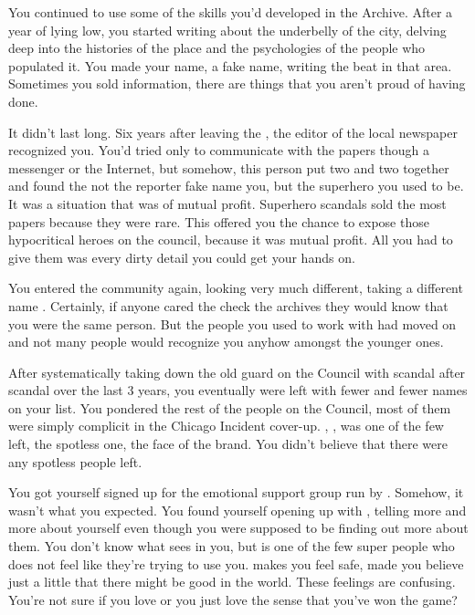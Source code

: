 \documentclass[char]{LRSguildcamp1}
\begin{document}
You continued to use some of the skills you'd developed in the Archive. After a year of lying low, you started writing about the underbelly of the city, delving deep into the histories of the place and the psychologies of the people who populated it. You made your name, a fake name, writing the beat in that area. Sometimes you sold information, there are things that you aren't proud of having done. 

It didn't last long. Six years after leaving the \cHeroLeague{}, the editor of the local newspaper recognized you. You'd tried only to communicate with the papers though a messenger or the Internet, but somehow, this person put two and two together and found the not the reporter fake name you, but the superhero you used to be. It was a situation that was of mutual profit. Superhero scandals sold the most papers because they were rare. This offered you the chance to expose those hypocritical heroes on the council, because it was mutual profit. All you had to give them was every dirty detail you could get your hands on. 

You entered the community again, looking very much different, taking a different name \cYS{\MYsupername}. Certainly, if anyone cared the check the archives they would know that you were the same person. But the people you used to work with had moved on and not many people would recognize you anyhow amongst the younger ones.  

After systematically taking down the old guard on the Council with scandal after scandal over the last 3 years, you eventually were left with fewer and fewer names on your list. You pondered the rest of the people on the Council, most of them were simply complicit in the Chicago Incident cover-up. \cYoungest{\MYsupername}, \cYoungest{}, was one of the few left, the spotless one, the face of the brand. You didn't believe that there were any spotless people left. 
 
You got yourself signed up for the emotional support group run by \cYoungest{\them}. Somehow, it wasn't what you expected. You found yourself opening up with \cYoungest{\them}, telling \cYoungest{\them} more and more about yourself even though you were supposed to be finding out more about them. You don't know what \cYoungest{\they} sees in you, but \cYoungest{\they} is one of the few super people who does not feel like they're trying to use you. \cYoungest{\intro} makes you feel safe, made you believe just a little that there might be good in the world. These feelings are confusing. You're not sure if you love \cYoungest{\intro} or you just love the sense that you've won the game?
\end{document}
